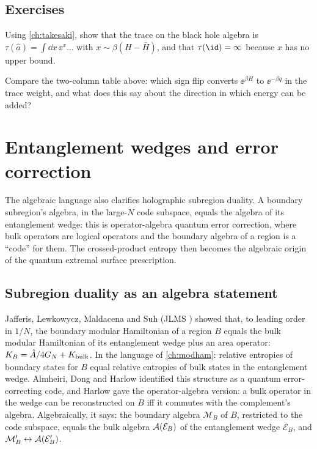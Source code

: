 \subsection*{Exercises}
\begin{exercise}\label{ex:bh_crossed:1}
Using \cref{ch:takesaki}, show that the trace on the black hole algebra is $\tau(\hat a)=\int\dd x\,\ee^{x}\ldots$ with $x\sim\beta(H-\bar H)$, and that $\tau(\id)=\infty$ because $x$ has no upper bound.
\end{exercise}
\begin{exercise}\label{ex:bh_crossed:2}
Compare the two-column table above: which sign flip converts $\ee^{\beta H}$ to $\ee^{-\beta q}$ in the trace weight, and what does this say about the direction in which energy can be added?
\end{exercise}

\section{Entanglement wedges and error correction}\label{ch:ew_qec}
\skippable

\mshift{42mm}\begin{physmotiv}
The algebraic language also clarifies holographic subregion duality. A boundary subregion's algebra, in the large-$N$ code subspace, equals the algebra of its entanglement wedge: this is operator-algebra quantum error correction, where bulk operators are logical operators and the boundary algebra of a region is a ``code'' for them. The crossed-product entropy then becomes the algebraic origin of the quantum extremal surface prescription.
\end{physmotiv}

\subsection{Subregion duality as an algebra statement}

Jafferis, Lewkowycz, Maldacena and Suh (JLMS \cite{JLMS2016}) showed that, to leading order in $1/N$, the boundary modular Hamiltonian of a region $B$ equals the bulk modular Hamiltonian of its entanglement wedge plus an area operator: $K_B=\hat A/4G_N+K_{\rm bulk}$. In the language of \cref{ch:modham}: relative entropies of boundary states for $B$ equal relative entropies of bulk states in the entanglement wedge. Almheiri, Dong and Harlow identified this structure as a quantum error-correcting code, and Harlow gave the operator-algebra version: a bulk operator in the wedge can be reconstructed on $B$ iff it commutes with the complement's algebra. Algebraically, it says: the boundary algebra $\mathcal M_B$ of $B$, restricted to the code subspace, equals the bulk algebra $\mathcal{A}(\mathcal E_B)$ of the entanglement wedge $\mathcal E_B$, and $\mathcal M_B'\leftrightarrow\mathcal{A}(\mathcal E_B')$.

